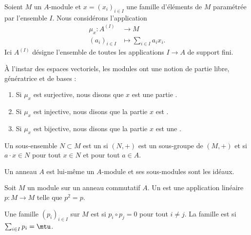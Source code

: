 Soient \( M\) un \( A\)-module et \( x=(x_i)_{i\in I}\) une famille d'éléments de \( M\) paramétrée par l'ensemble \( I\). Nous considérons l'application
\begin{equation}
    \begin{aligned}
        \mu_x\colon A^{(I)}&\to M \\
        (a_i)_{i\in I}&\mapsto \sum_{i\in I}a_ix_i.
    \end{aligned}
\end{equation}
Ici \( A^{(I)}\) désigne l'ensemble de toutes les applications \( I\to A\) de support fini.

\begin{definition}      \label{DefBasePouyKj}
    À l'instar des espaces vectoriels, les modules ont une notion de partie libre, génératrice et de bases :
    \begin{enumerate}
        \item
            Si \( \mu_x\) est surjective, nous disons que \( x\) est une partie .
        \item
            Si \( \mu_x\) est injective, nous disons que la partie \( x\) est .
        \item
            Si \( \mu_x\) est bijective, nous disons que la partie \( x\) est une .
    \end{enumerate}
\end{definition}

\begin{definition}
  Un sous-ensemble \( N\subset M\) est un  si \( (N,+)\) est un sous-groupe de \( (M,+)\) et si \( a\cdot x\in N\) pour tout \( x\in N\) et pour tout \( a\in A\).
\end{definition}

\begin{example}
    Un anneau \( A\) est lui-même un \( A\)-module et ses sous-modules sont les idéaux.
\end{example}

\begin{definition}
    Soit \( M\) un module sur un anneau commutatif \( A\). Un  est une application linéaire \( p\colon M\to M\) telle que \( p^2=p\).

    Une famille \( (p_i)_{i\in I}\) sur \( M\) est  si \( p_i\circ p_j=0\) pour tout \( i\neq j\). La famille est  si \( \sum_{i\in I}p_i=\mtu\).
\end{definition}

